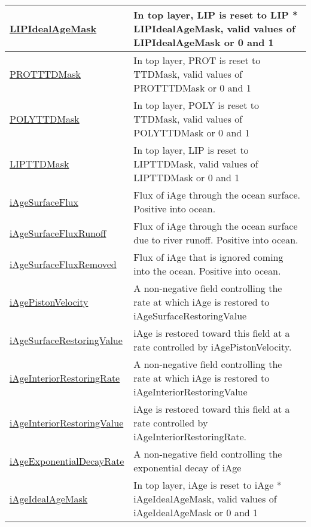 {\begin{center}
\begin{longtable}{| p{2.0in} | p{4.0in} |}
    \hline
    \hyperref[subsec:var_sec_forcing_LIPIdealAgeMask]{LIPIdealAgeMask} & In top layer, LIP is reset to LIP * LIPIdealAgeMask, valid values of LIPIdealAgeMask or 0 and 1 \\
    \hline
    \hyperref[subsec:var_sec_forcing_PROTTTDMask]{PROTTTDMask} & In top layer, PROT is reset to TTDMask, valid values of PROTTTDMask or 0 and 1 \\
    \hline
    \hyperref[subsec:var_sec_forcing_POLYTTDMask]{POLYTTDMask} & In top layer, POLY is reset to TTDMask, valid values of POLYTTDMask or 0 and 1 \\
    \hline
    \hyperref[subsec:var_sec_forcing_LIPTTDMask]{LIPTTDMask} & In top layer, LIP is reset to LIPTTDMask, valid values of LIPTTDMask or 0 and 1 \\
    \hline
    \hyperref[subsec:var_sec_forcing_iAgeSurfaceFlux]{iAgeSurfaceFlux} & Flux of iAge through the ocean surface. Positive into ocean. \\
    \hline
    \hyperref[subsec:var_sec_forcing_iAgeSurfaceFluxRunoff]{iAgeSurfaceFluxRunoff} & Flux of iAge through the ocean surface due to river runoff. Positive into ocean. \\
    \hline
    \hyperref[subsec:var_sec_forcing_iAgeSurfaceFluxRemoved]{iAgeSurfaceFluxRemoved} & Flux of iAge that is ignored coming into the ocean. Positive into ocean. \\
    \hline
    \hyperref[subsec:var_sec_forcing_iAgePistonVelocity]{iAgePistonVelocity} & A non-negative field controlling the rate at which iAge is restored to iAgeSurfaceRestoringValue \\
    \hline
    \hyperref[subsec:var_sec_forcing_iAgeSurfaceRestoringValue]{iAgeSurfaceRestoringValue} & iAge is restored toward this field at a rate controlled by iAgePistonVelocity. \\
    \hline
    \hyperref[subsec:var_sec_forcing_iAgeInteriorRestoringRate]{iAgeInteriorRestoringRate} & A non-negative field controlling the rate at which iAge is restored to iAgeInteriorRestoringValue \\
    \hline
    \hyperref[subsec:var_sec_forcing_iAgeInteriorRestoringValue]{iAgeInteriorRestoringValue} & iAge is restored toward this field at a rate controlled by iAgeInteriorRestoringRate. \\
    \hline
    \hyperref[subsec:var_sec_forcing_iAgeExponentialDecayRate]{iAgeExponentialDecayRate} & A non-negative field controlling the exponential decay of iAge \\
    \hline
    \hyperref[subsec:var_sec_forcing_iAgeIdealAgeMask]{iAgeIdealAgeMask} & In top layer, iAge is reset to iAge * iAgeIdealAgeMask, valid values of iAgeIdealAgeMask or 0 and 1 \\

\end{longtable}
\end{center}}
